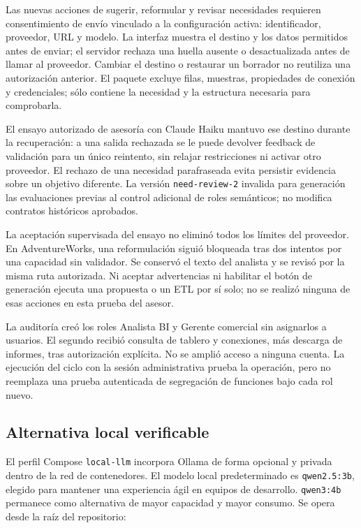 \documentclass[11pt,letterpaper]{article}
\newcommand{\file}[1]{\texttt{#1}}
\begin{document}
Las nuevas acciones de sugerir, reformular y revisar necesidades requieren
consentimiento de envío vinculado a la configuración activa: identificador, proveedor,
URL y modelo. La interfaz muestra el destino y los datos permitidos antes de enviar;
el servidor rechaza una huella ausente o desactualizada antes de llamar al proveedor.
Cambiar el destino o restaurar un borrador no reutiliza una autorización anterior.
El paquete excluye filas, muestras, propiedades de conexión y credenciales; sólo
contiene la necesidad y la estructura necesaria para comprobarla.

El ensayo autorizado de asesoría con Claude Haiku mantuvo ese destino durante la
recuperación: a una salida rechazada se le puede devolver feedback de validación para
un único reintento, sin relajar restricciones ni activar otro proveedor. El rechazo
de una necesidad parafraseada evita persistir evidencia sobre un objetivo diferente.
La versión \file{need-review-2} invalida para generación las evaluaciones previas al
control adicional de roles semánticos; no modifica contratos históricos aprobados.

La aceptación supervisada del ensayo no eliminó todos los límites del proveedor.
En AdventureWorks, una reformulación siguió bloqueada tras dos intentos por una
capacidad sin validador. Se conservó el texto del analista y se revisó por la misma
ruta autorizada. Ni aceptar advertencias ni habilitar el botón de generación ejecuta
una propuesta o un ETL por sí solo; no se realizó ninguna de esas acciones en esta
prueba del asesor.

La auditoría creó los roles Analista BI y Gerente comercial sin asignarlos a usuarios.
El segundo recibió consulta de tablero y conexiones, más descarga de informes, tras
autorización explícita. No se amplió acceso a ninguna cuenta. La ejecución del ciclo
con la sesión administrativa prueba la operación, pero no reemplaza una prueba
autenticada de segregación de funciones bajo cada rol nuevo.

\subsection{Alternativa local verificable}

El perfil Compose \file{local-llm} incorpora Ollama de forma opcional y privada dentro de la red de contenedores. El modelo local predeterminado es \file{qwen2.5:3b}, elegido para mantener una experiencia ágil en equipos de desarrollo. \file{qwen3:4b} permanece como alternativa de mayor capacidad y mayor consumo. Se opera desde la raíz del repositorio:
\end{document}
